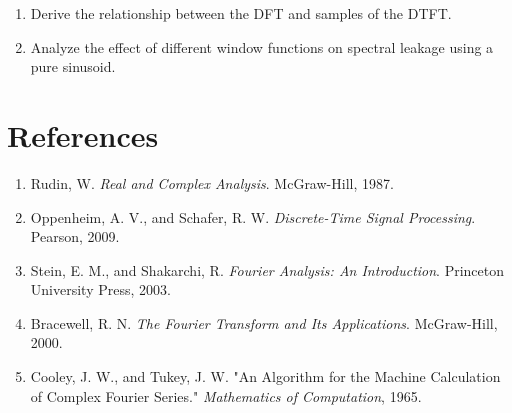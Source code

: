 \begin{notechapter}
\begin{enumerate}
\item Derive the relationship between the DFT and samples of the DTFT.

\item Analyze the effect of different window functions on spectral leakage using a pure sinusoid.
\end{enumerate}

\section{References}

\begin{enumerate}
\item Rudin, W. \emph{Real and Complex Analysis}. McGraw-Hill, 1987.
\item Oppenheim, A. V., and Schafer, R. W. \emph{Discrete-Time Signal Processing}. Pearson, 2009.
\item Stein, E. M., and Shakarchi, R. \emph{Fourier Analysis: An Introduction}. Princeton University Press, 2003.
\item Bracewell, R. N. \emph{The Fourier Transform and Its Applications}. McGraw-Hill, 2000.
\item Cooley, J. W., and Tukey, J. W. "An Algorithm for the Machine Calculation of Complex Fourier Series." \emph{Mathematics of Computation}, 1965.
\end{enumerate}
\end{notechapter}
